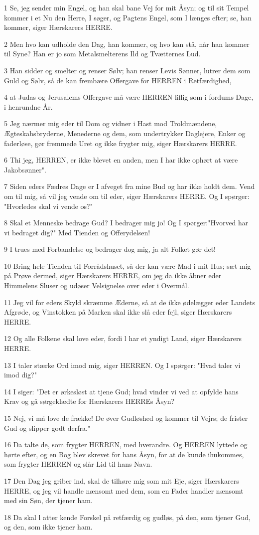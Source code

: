 \par 1 Se, jeg sender min Engel, og han skal bane Vej for mit Åsyn; og til sit Tempel kommer i et Nu den Herre, I søger, og Pagtens Engel, som I længes efter; se, han kommer, siger Hærskarers HERRE.
\par 2 Men hvo kan udholde den Dag, han kommer, og hvo kan stå, når han kommer til Syne? Han er jo som Metalsmelterens Ild og Tvætternes Lud.
\par 3 Han sidder og smelter og renser Sølv; han renser Levis Sønner, lutrer dem som Guld og Sølv, så de kan frembære Offergave for HERREN i Retfærdighed,
\par 4 at Judas og Jerusalems Offergave må være HERREN liflig som i fordums Dage, i henrundne År.
\par 5 Jeg nærmer mig eder til Dom og vidner i Hast mod Troldmændene, Ægteskabsbryderne, Menederne og dem, som undertrykker Daglejere, Enker og faderløse, gør fremmede Uret og ikke frygter mig, siger Hærskarers HERRE.
\par 6 Thi jeg, HERREN, er ikke blevet en anden, men I har ikke ophørt at være Jakobsønner".
\par 7 Siden eders Fædres Dage er I afveget fra mine Bud og har ikke holdt dem. Vend om til mig, så vil jeg vende om til eder, siger Hærskarers HERRE. Og I spørger: "Hvorledes skal vi vende os?"
\par 8 Skal et Menneske bedrage Gud? I bedrager mig jo! Og I spørger:"Hvorved har vi bedraget dig?" Med Tienden og Offerydelsen!
\par 9 I trues med Forbandelse og bedrager dog mig, ja alt Folket gør det!
\par 10 Bring hele Tienden tiI Forrådshuset, så der kan være Mad i mit Hus; sæt mig på Prøve dermed, siger Hærskarers HERRE, om jeg da ikke åbner eder Himmelens Sluser og udøser Velsignelse over eder i Overmål.
\par 11 Jeg vil for eders Skyld skræmme Æderne, så at de ikke ødelægger eder Landets Afgrøde, og Vinstokken på Marken skal ikke slå eder fejl, siger Hærskarers HERRE.
\par 12 Og alle Folkene skal love eder, fordi l har et yndigt Land, siger Hærskarers HERRE.
\par 13 I taler stærke Ord imod mig, siger HERREN. Og I spørger: "Hvad taler vi imod dig?"
\par 14 I siger: "Det er ørkesløst at tjene Gud; hvad vinder vi ved at opfylde hans Krav og gå sørgeklædte for Hærskarers HERREs Åsyn?
\par 15 Nej, vi må love de frække! De øver Gudløshed og kommer til Vejrs; de frister Gud og slipper godt derfra."
\par 16 Da talte de, som frygter HERREN, med hverandre. Og HERREN lyttede og hørte efter, og en Bog blev skrevet for hans Åsyn, for at de kunde ihukommes, som frygter HERREN og slår Lid til hans Navn.
\par 17 Den Dag jeg griber ind, skal de tilhøre mig som mit Eje, siger Hærskarers HERRE, og jeg vil handle nænsomt med dem, som en Fader handler nænsomt med sin Søn, der tjener ham.
\par 18 Da skal l atter kende Forskel på retfærdig og gudløs, på den, som tjener Gud, og den, som ikke tjener ham.

